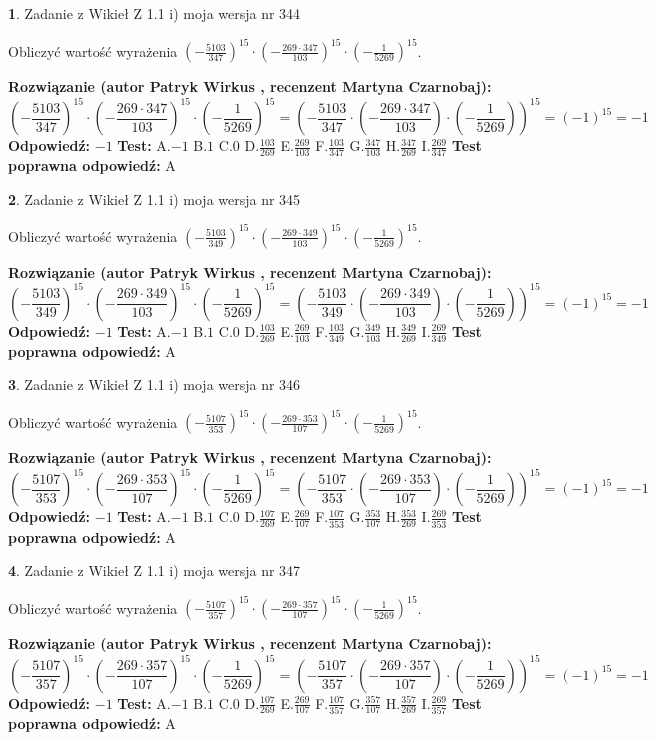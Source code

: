 \documentclass[12pt, a4paper]{article}
\theoremstyle{definition} %
\newtheorem{zad}{}
\newcommand{\zadStart}[1]{\begin{zad}#1\newline}
\newcommand{\zadStop}{\end{zad}}
\newcommand{\rozwStart}[2]{\noindent \textbf{Rozwiązanie (autor #1 , recenzent #2): }\newline}
\newcommand{\rozwStop}{\newline}
\newcommand{\odpStart}{\noindent \textbf{Odpowiedź:}\newline}
\newcommand{\odpStop}{\newline}
\newcommand{\testStart}{\noindent \textbf{Test:}\newline}
\newcommand{\testStop}{\newline}
\newcommand{\kluczStart}{\noindent \textbf{Test poprawna odpowiedź:}\newline}
\newcommand{\kluczStop}{\newline}
\begin{document}
\zadStart{Zadanie z Wikieł Z 1.1 i) moja wersja nr 344}

Obliczyć wartość wyrażenia $(-\frac{5103}{347})^{15} \cdot (-\frac{269 \cdot 347}{103})^{15} \cdot (-\frac{1}{5269})^{15}$.
\zadStop
\rozwStart{Patryk Wirkus}{Martyna Czarnobaj}
$$(-\frac{5103}{347})^{15} \cdot (-\frac{269 \cdot 347}{103})^{15} \cdot (-\frac{1}{5269})^{15} = (-\frac{5103}{347} \cdot (-\frac{269 \cdot 347}{103}) \cdot (-\frac{1}{5269}))^{15} = (-1)^{15} = -1$$
\rozwStop
\odpStart
$-1$
\odpStop
\testStart
A.$-1$ B.$1$ C.$0$ D.$\frac{103}{269}$ E.$\frac{269}{103}$
F.$\frac{103}{347}$ G.$\frac{347}{103}$
H.$\frac{347}{269}$
I.$\frac{269}{347}$
\testStop
\kluczStart
A
\kluczStop



\zadStart{Zadanie z Wikieł Z 1.1 i) moja wersja nr 345}

Obliczyć wartość wyrażenia $(-\frac{5103}{349})^{15} \cdot (-\frac{269 \cdot 349}{103})^{15} \cdot (-\frac{1}{5269})^{15}$.
\zadStop
\rozwStart{Patryk Wirkus}{Martyna Czarnobaj}
$$(-\frac{5103}{349})^{15} \cdot (-\frac{269 \cdot 349}{103})^{15} \cdot (-\frac{1}{5269})^{15} = (-\frac{5103}{349} \cdot (-\frac{269 \cdot 349}{103}) \cdot (-\frac{1}{5269}))^{15} = (-1)^{15} = -1$$
\rozwStop
\odpStart
$-1$
\odpStop
\testStart
A.$-1$ B.$1$ C.$0$ D.$\frac{103}{269}$ E.$\frac{269}{103}$
F.$\frac{103}{349}$ G.$\frac{349}{103}$
H.$\frac{349}{269}$
I.$\frac{269}{349}$
\testStop
\kluczStart
A
\kluczStop



\zadStart{Zadanie z Wikieł Z 1.1 i) moja wersja nr 346}

Obliczyć wartość wyrażenia $(-\frac{5107}{353})^{15} \cdot (-\frac{269 \cdot 353}{107})^{15} \cdot (-\frac{1}{5269})^{15}$.
\zadStop
\rozwStart{Patryk Wirkus}{Martyna Czarnobaj}
$$(-\frac{5107}{353})^{15} \cdot (-\frac{269 \cdot 353}{107})^{15} \cdot (-\frac{1}{5269})^{15} = (-\frac{5107}{353} \cdot (-\frac{269 \cdot 353}{107}) \cdot (-\frac{1}{5269}))^{15} = (-1)^{15} = -1$$
\rozwStop
\odpStart
$-1$
\odpStop
\testStart
A.$-1$ B.$1$ C.$0$ D.$\frac{107}{269}$ E.$\frac{269}{107}$
F.$\frac{107}{353}$ G.$\frac{353}{107}$
H.$\frac{353}{269}$
I.$\frac{269}{353}$
\testStop
\kluczStart
A
\kluczStop



\zadStart{Zadanie z Wikieł Z 1.1 i) moja wersja nr 347}

Obliczyć wartość wyrażenia $(-\frac{5107}{357})^{15} \cdot (-\frac{269 \cdot 357}{107})^{15} \cdot (-\frac{1}{5269})^{15}$.
\zadStop
\rozwStart{Patryk Wirkus}{Martyna Czarnobaj}
$$(-\frac{5107}{357})^{15} \cdot (-\frac{269 \cdot 357}{107})^{15} \cdot (-\frac{1}{5269})^{15} = (-\frac{5107}{357} \cdot (-\frac{269 \cdot 357}{107}) \cdot (-\frac{1}{5269}))^{15} = (-1)^{15} = -1$$
\rozwStop
\odpStart
$-1$
\odpStop
\testStart
A.$-1$ B.$1$ C.$0$ D.$\frac{107}{269}$ E.$\frac{269}{107}$
F.$\frac{107}{357}$ G.$\frac{357}{107}$
H.$\frac{357}{269}$
I.$\frac{269}{357}$
\testStop
\kluczStart
A
\kluczStop
\end{document}
